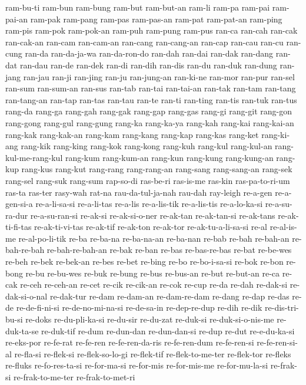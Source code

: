 {ram-bu-ti ram-bun ram-bung ram-but ram-but-an ram-li ram-pa ram-pai
ram-pai-an ram-pak ram-pang ram-pas ram-pas-an ram-pat ram-pat-an ram-ping
ram-pis ram-pok ram-pok-an ram-puh ram-pung ram-pus ran-ca ran-cah ran-cak
ran-cak-an ran-cam ran-cam-an ran-cang ran-cang-an ran-cap ran-cau ran-cu
ran-cung ran-da ran-da-ja-wa ran-da-ron-do ran-dah ran-dai ran-dak
ran-dang ran-dat ran-dau ran-de ran-dek ran-di ran-dih ran-dis ran-du
ran-duk ran-dung ran-jang ran-jau ran-ji ran-jing ran-ju ran-jung-an
ran-ki-ne ran-mor ran-pur ran-sel ran-sum ran-sum-an ran-sus ran-tab
ran-tai ran-tai-an ran-tak ran-tam ran-tang ran-tang-an ran-tap ran-tas
ran-tau ran-te ran-ti ran-ting ran-tis ran-tuk ran-tus rang-da rang-ga
rang-gah rang-gak rang-gap rang-gas rang-gi rang-git rang-gon rang-gong
rang-gul rang-gung rang-ka rang-ka-ya rang-kah rang-kai rang-kai-an
rang-kak rang-kak-an rang-kam rang-kang rang-kap rang-kas rang-ket
rang-ki-ang rang-kik rang-king rang-kok rang-kong rang-kuh rang-kul
rang-kul-an rang-kul-me-rang-kul rang-kum rang-kum-an rang-kun rang-kung
rang-kung-an rang-kup rang-kus rang-kut rang-rang rang-rang-an rang-sang
rang-sang-an rang-sek rang-sel rang-suk rang-sum rap-so-di ras-be-ri
ras-is-me ras-kin ras-pa-to-ri-um ras-ta ras-ter rasy-wah rat-na
rau-da-tul-ja-nah rau-dah ray-leigh re-a-gen re-a-gen-si-a re-a-li-sa-si
re-a-li-tas re-a-lis re-a-lis-tik re-a-lis-tis re-a-lo-ka-si
re-a-su-ra-dur re-a-su-ran-si re-ak-si re-ak-si-o-ner re-ak-tan
re-ak-tan-si re-ak-tans re-ak-ti-fi-tas re-ak-ti-vi-tas re-ak-tif
re-ak-ton re-ak-tor re-ak-tu-a-li-sa-si re-al re-al-is-me re-al-po-li-tik
re-ba re-ba-na re-ba-na-an re-ba-nan re-bab re-bah re-bah-an re-bah-re-bah
re-bah-re-bah-an re-bak re-ban re-bas re-bas-re-bas re-bat re-be-wes
re-beh re-bek re-bek-an re-bes re-bet re-bing re-bo re-bo-i-sa-si re-bok
re-bon re-bong re-bu re-bu-wes re-buk re-bung re-bus re-bus-an re-but
re-but-an re-ca re-cak re-ceh re-ceh-an re-cet re-cik re-cik-an re-cok
re-cup re-da re-dah re-dak-si re-dak-si-o-nal re-dak-tur re-dam re-dam-an
re-dam-re-dam re-dang re-dap re-das re-de re-de-fi-ni-si re-de-no-mi-na-si
re-de-sa-in re-dep-re-dup re-dih re-dik re-dis-tri-bu-si re-doks
re-du-pli-ka-si re-du-sir re-du-zat re-duk-si re-duk-si-o-nis-me
re-duk-ta-se re-duk-tif re-dum re-dun-dan re-dun-dan-si re-dup re-dut
re-e-du-ka-si re-eks-por re-fe-rat re-fe-ren re-fe-ren-da-ris
re-fe-ren-dum re-fe-ren-si re-fe-ren-si-al re-fla-si re-flek-si
re-flek-so-lo-gi re-flek-tif re-flek-to-me-ter re-flek-tor re-fleks
re-fluks re-fo-res-ta-si re-for-ma-si re-for-mis re-for-mis-me
re-for-mu-la-si re-frak-si re-frak-to-me-ter re-frak-to-met-ri
}
